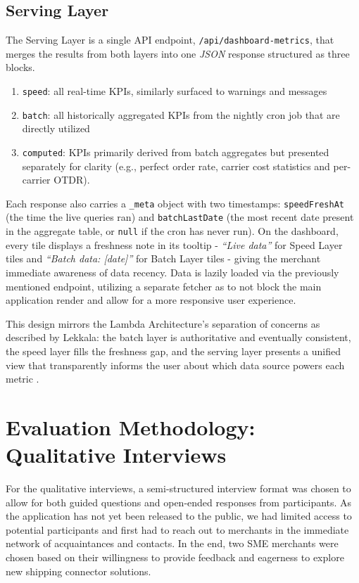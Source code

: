 \documentclass{imc-inf}
\begin{document}
\subsection{Serving Layer}

The Serving Layer is a single API endpoint, \texttt{/api/dashboard-metrics}, that merges the results from both layers into one \textit{JSON} response structured as three blocks.

\begin{enumerate}[left=0pt, itemsep=3pt]
  \item \texttt{speed}: all real-time KPIs, similarly surfaced to warnings and messages
  \item \texttt{batch}: all historically aggregated KPIs from the nightly cron job that are directly utilized
  \item \texttt{computed}: KPIs primarily derived from batch aggregates but presented separately for clarity (e.g., perfect order rate, carrier cost statistics and per-carrier OTDR).
\end{enumerate}

Each response also carries a \texttt{\_meta} object with two timestamps: \texttt{speedFreshAt} (the time the live queries ran) and \texttt{batchLastDate} (the most recent date present in the aggregate table, or \texttt{null} if the cron has never run).
On the dashboard, every tile displays a freshness note in its tooltip - \textit{“Live data”} for Speed Layer tiles and \textit{“Batch data: [date]”} for Batch Layer tiles - giving the merchant immediate awareness of data recency.
Data is lazily loaded via the previously mentioned endpoint, utilizing a separate fetcher as to not block the main application render and allow for a more responsive user experience.

This design mirrors the Lambda Architecture's separation of concerns as described by Lekkala: the batch layer is authoritative and eventually consistent, the speed layer fills the freshness gap, and the serving layer presents a unified view that transparently informs the user about which data source powers each metric \cite{lekkalaLeveragingLambdaArchitecture2020}.

\section{Evaluation Methodology: Qualitative Interviews}
\label{sec:qualitative-interviews}
For the qualitative interviews, a semi-structured interview format was chosen to allow for both guided questions and open-ended responses from participants.
As the application has not yet been released to the public, we had limited access to potential participants and first had to reach out to merchants in the immediate network of acquaintances and contacts.
In the end, two SME merchants were chosen based on their willingness to provide feedback and eagerness to explore new shipping connector solutions.
\end{document}
